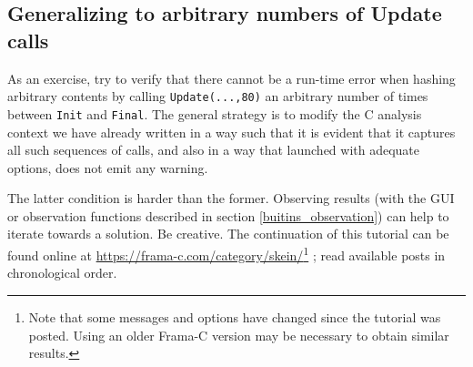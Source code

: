 \documentclass{frama-c-book}
\begin{document}
\subsection{Generalizing to arbitrary numbers of Update calls}

As an exercise, try to verify that there cannot be a run-time error
when hashing arbitrary contents by
calling \lstinline|Update(...,80)| an arbitrary number of times
between \lstinline|Init| and \lstinline|Final|.  The general strategy
is to modify the C analysis context we have already written in a way
such that it is evident that it captures all such sequences of calls,
and also in a way that launched with adequate options,
\Eva{} does not emit any warning.

The latter condition is harder than the former.
Observing results (with the GUI or observation functions
described in section \ref{buitins_observation}) can help to iterate towards
a solution. Be creative. The continuation of this tutorial can be found online
at \url{https://frama-c.com/category/skein/}\footnote{Note that some
  messages and options have changed since the tutorial was posted. Using an
  older Frama-C version may be necessary to obtain similar results.}
; read available posts in chronological order.


\end{document}
